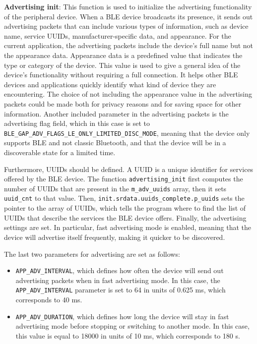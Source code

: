 \documentclass{Configuration_Files/PoliMi3i_thesis}
\begin{document}
\textbf{Advertising init}: This function is used to initialize the advertising functionality of the peripheral device. When a BLE device broadcasts its presence, it sends out advertising packets that can include various types of information, such as device name, service UUIDs, manufacturer-specific data, and appearance. For the current application, the advertising packets include the device’s full name but not the appearance data. Appearance data is a predefined value that indicates the type or category of the device. This value is used to give a general idea of the device's functionality without requiring a full connection. It helps other BLE devices and applications quickly identify what kind of device they are encountering. The choice of not including the appearance value in the advertising packets could be made both for privacy reasons and for saving space for other information. Another included parameter in the advertising packets is the advertising flag field, which in this case is set to \texttt{BLE\_GAP\_ADV\_FLAGS\_LE\_ONLY\_LIMITED\_DISC\_MODE}, meaning that the device only supports BLE and not classic Bluetooth, and that the device will be in a discoverable state for a limited time. 

Furthermore, UUIDs should be defined. A UUID is a unique identifier for services offered by the BLE device. The function \texttt{advertising\_init} first computes the number of UUIDs that are present in the \texttt{m\_adv\_uuids} array, then it sets \texttt{uuid\_cnt} to that value. Then, \texttt{init.srdata.uuids\_complete.p\_uuids} sets the pointer to the array of UUIDs, which tells the program where to find the list of UUIDs that describe the services the BLE device offers. Finally, the advertising settings are set. In particular, fast advertising mode is enabled, meaning that the device will advertise itself frequently, making it quicker to be discovered. 

The last two parameters for advertising are set as follows:
\begin{itemize}
    \item \texttt{APP\_ADV\_INTERVAL}, which defines how often the device will send out advertising packets when in fast advertising mode. In this case, the \texttt{APP\_ADV\_INTERVAL} parameter is set to 64 in units of 0.625 ms, which corresponds to 40 ms.
    \item \texttt{APP\_ADV\_DURATION}, which defines how long the device will stay in fast advertising mode before stopping or switching to another mode. In this case, this value is equal to 18000 in units of 10 ms, which corresponds to 180 s.
\end{itemize}
\end{document}
